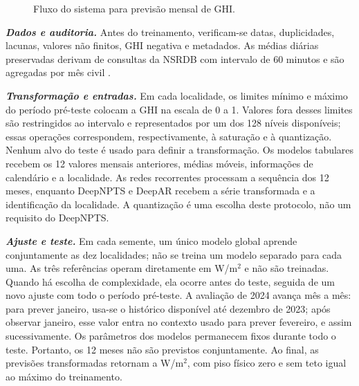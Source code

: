\documentclass[12pt,a4paper,fleqn]{article}
\begin{document}
\begin{figure}[!ht]
\centering
{}
\caption{Fluxo do sistema para previsão mensal de GHI.}
\label{fig:sistema}
\end{figure}

\noindent\textbf{\textit{Dados e auditoria.}} Antes do treinamento, verificam-se datas, duplicidades, lacunas, valores não finitos, GHI negativa e metadados. As médias diárias preservadas derivam de consultas da NSRDB com intervalo de 60 minutos e são agregadas por mês civil \citep{sengupta2018}.

\noindent\textbf{\textit{Transformação e entradas.}} Em cada localidade, os limites mínimo e máximo do período pré-teste colocam a GHI na escala de 0 a 1. Valores fora desses limites são restringidos ao intervalo e representados por um dos 128 níveis disponíveis; essas operações correspondem, respectivamente, à saturação e à quantização. Nenhum alvo do teste é usado para definir a transformação. Os modelos tabulares recebem os 12 valores mensais anteriores, médias móveis, informações de calendário e a localidade. As redes recorrentes processam a sequência dos 12 meses, enquanto DeepNPTS e DeepAR recebem a série transformada e a identificação da localidade. A quantização é uma escolha deste protocolo, não um requisito do DeepNPTS.

\noindent\textbf{\textit{Ajuste e teste.}} Em cada semente, um único modelo global aprende conjuntamente as dez localidades; não se treina um modelo separado para cada uma. As três referências operam diretamente em W/m$^2$ e não são treinadas. Quando há escolha de complexidade, ela ocorre antes do teste, seguida de um novo ajuste com todo o período pré-teste. A avaliação de 2024 avança mês a mês: para prever janeiro, usa-se o histórico disponível até dezembro de 2023; após observar janeiro, esse valor entra no contexto usado para prever fevereiro, e assim sucessivamente. Os parâmetros dos modelos permanecem fixos durante todo o teste. Portanto, os 12 meses não são previstos conjuntamente. Ao final, as previsões transformadas retornam a W/m$^2$, com piso físico zero e sem teto igual ao máximo do treinamento.
\end{document}
